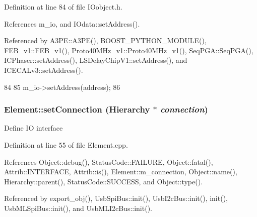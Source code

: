 Definition at line 84 of file IOobject.h.

References m\_\-io, and IOdata::setAddress().

Referenced by A3PE::A3PE(), BOOST\_\-PYTHON\_\-MODULE(), FEB\_\-v1::FEB\_\-v1(), Proto40MHz\_\-v1::Proto40MHz\_\-v1(), SeqPGA::SeqPGA(), ICPhaser::setAddress(), LSDelayChipV1::setAddress(), and ICECALv3::setAddress().


\begin{DoxyCode}
84                               {
85     m_io->setAddress(address);
86   }
\end{DoxyCode}
\hypertarget{classElement_ab476b4b1df5954141ceb14f072433b89}{
\subsubsection[{setConnection}]{ Element::setConnection ({\bf Hierarchy} $\ast$ {\em connection})}}
\label{classElement_ab476b4b1df5954141ceb14f072433b89}
Define IO interface 

Definition at line 55 of file Element.cpp.

References Object::debug(), StatusCode::FAILURE, Object::fatal(), Attrib::INTERFACE, Attrib::is(), Element::m\_\-connection, Object::name(), Hierarchy::parent(), StatusCode::SUCCESS, and Object::type().

Referenced by export\_\-obj(), UsbSpiBus::init(), UsbI2cBus::init(), init(), UsbMLSpiBus::init(), and UsbMLI2cBus::init().


